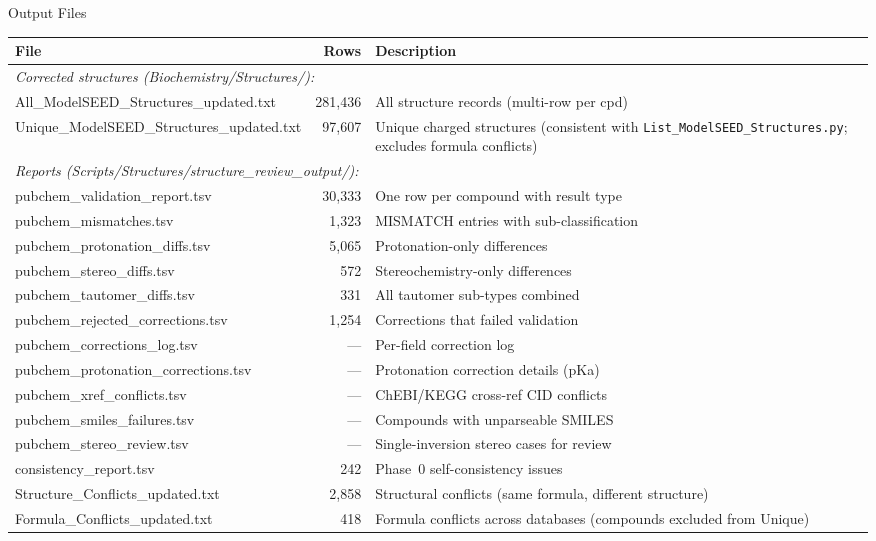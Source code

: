 \documentclass[aspectratio=169,11pt]{beamer}
\begin{document}
\begin{frame}{Output Files}

\footnotesize
\begin{tabular}{p{5.5cm}rp{6.5cm}}
\toprule
\textbf{File} & \textbf{Rows} & \textbf{Description} \\
\midrule
\multicolumn{3}{l}{\textit{Corrected structures
  (Biochemistry/Structures/):}} \\[1pt]
All\_ModelSEED\_Structures\_updated.txt   & 281,436 &
  All structure records (multi-row per cpd) \\
Unique\_ModelSEED\_Structures\_updated.txt &  97,607 &
  Unique charged structures (consistent with
  \texttt{List\_ModelSEED\_Structures.py}; excludes
  formula conflicts) \\[4pt]
\multicolumn{3}{l}{\textit{Reports
  (Scripts/Structures/structure\_review\_output/):}} \\[1pt]
pubchem\_validation\_report.tsv  & 30,333 &
  One row per compound with result type \\
pubchem\_mismatches.tsv          &  1,323 &
  MISMATCH entries with sub-classification \\
pubchem\_protonation\_diffs.tsv  &  5,065 &
  Protonation-only differences \\
pubchem\_stereo\_diffs.tsv       &    572 &
  Stereochemistry-only differences \\
pubchem\_tautomer\_diffs.tsv     &    331 &
  All tautomer sub-types combined \\
pubchem\_rejected\_corrections.tsv & 1,254 &
  Corrections that failed validation \\
pubchem\_corrections\_log.tsv    &    --- &
  Per-field correction log \\
pubchem\_protonation\_corrections.tsv & --- &
  Protonation correction details (pKa) \\
pubchem\_xref\_conflicts.tsv     &    --- &
  ChEBI/KEGG cross-ref CID conflicts \\
pubchem\_smiles\_failures.tsv    &    --- &
  Compounds with unparseable SMILES \\
pubchem\_stereo\_review.tsv      &    --- &
  Single-inversion stereo cases for review \\
consistency\_report.tsv          &    242 &
  Phase~0 self-consistency issues \\
Structure\_Conflicts\_updated.txt & 2,858 &
  Structural conflicts (same formula, different structure) \\
Formula\_Conflicts\_updated.txt  &    418 &
  Formula conflicts across databases (compounds excluded
  from Unique) \\
\bottomrule
\end{tabular}

\end{frame}
\end{document}
